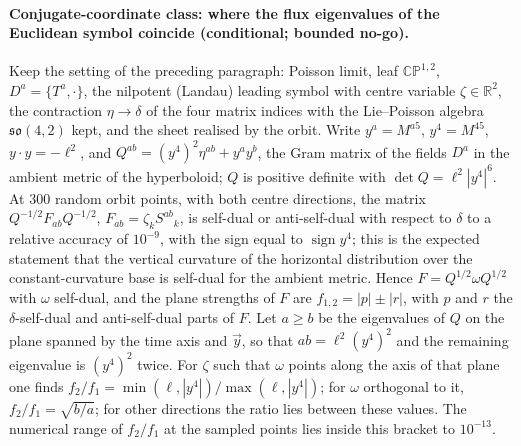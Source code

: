 \paragraph{Conjugate-coordinate class: where the flux eigenvalues of the Euclidean symbol coincide (conditional; bounded no-go).}
Keep the setting of the preceding paragraph: Poisson limit, leaf \(\mathbb{CP}^{1,2}\), \(D^a=\{T^a,\cdot\}\), the nilpotent (Landau) leading symbol with centre variable \(\zeta\in\mathbb R^2\), the contraction \(\eta\to\delta\) of the four matrix indices with the Lie--Poisson algebra \(\mathfrak{so}(4,2)\) kept, and the sheet realised by the orbit. Write \(y^a=M^{a5}\), \(y^4=M^{45}\), \(y\cdot y=-\ell^2\), and \(Q^{ab}=(y^4)^2\eta^{ab}+y^ay^b\), the Gram matrix of the fields \(D^a\) in the ambient metric of the hyperboloid; \(Q\) is positive definite with \(\det Q=\ell^2|y^4|^6\). At \(300\) random orbit points, with both centre directions, the matrix \(Q^{-1/2}F_{ab}Q^{-1/2}\), \(F_{ab}=\zeta_kS^{ab}{}_k\), is self-dual or anti-self-dual with respect to \(\delta\) to a relative accuracy of \(10^{-9}\), with the sign equal to \(\operatorname{sign}y^4\); this is the expected statement that the vertical curvature of the horizontal distribution over the constant-curvature base is self-dual for the ambient metric. Hence \(F=Q^{1/2}\omega Q^{1/2}\) with \(\omega\) self-dual, and the plane strengths of \(F\) are \(f_{1,2}=|p|\pm|r|\), with \(p\) and \(r\) the \(\delta\)-self-dual and anti-self-dual parts of \(F\). Let \(a\ge b\) be the eigenvalues of \(Q\) on the plane spanned by the time axis and \(\vec y\), so that \(ab=\ell^2(y^4)^2\) and the remaining eigenvalue is \((y^4)^2\) twice. For \(\zeta\) such that \(\omega\) points along the axis of that plane one finds \(f_2/f_1=\min(\ell,|y^4|)/\max(\ell,|y^4|)\); for \(\omega\) orthogonal to it, \(f_2/f_1=\sqrt{b/a}\); for other directions the ratio lies between these values. The numerical range of \(f_2/f_1\) at the sampled points lies inside this bracket to \(10^{-13}\).

